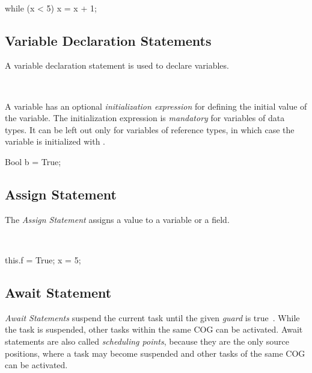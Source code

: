 \begin{abssyntax}
\ \TRS{(}  \TRS{)}\ 
\end{abssyntax}

\begin{absexample}
while (x < 5)
   x = x + 1;
\end{absexample}

\subsection{Variable Declaration Statements}
A variable declaration statement is used to declare variables.

\begin{abssyntax}
  {}\ \ \ \TRS{;}  
\end{abssyntax}

A variable has an optional \emph{initialization expression} for defining the initial value of the variable. The initialization expression is \emph{mandatory} for variables of data types.
It can be left out only for variables of reference types, in which case the variable is initialized with .

\begin{absexample}
Bool b = True;  
\end{absexample}

\subsection{Assign Statement}
The \emph{Assign Statement} assigns a value to a variable or a field.

\begin{abssyntax}
  {}\ \TRS{=}\ \ \TRS{;}
               {}\ \TRS{=}\ \ \TRS{;}
\end{abssyntax}

\begin{absexample}
this.f = True;
x = 5;
\end{absexample}


\subsection{Await Statement}
\emph{Await Statements} suspend the current task until the given \emph{guard} is true~\cite{johnsen10fmco}. 
While the task is suspended, other tasks within the same COG can be activated. 
Await statements are also called \emph{scheduling points}, because they are the only source positions,
where a task may become suspended and other tasks of the same COG can be activated.


